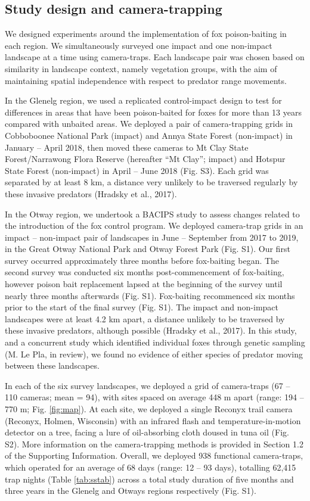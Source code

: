 \documentclass[]{elsarticle} %
\begin{document}
\hypertarget{study-design-and-camera-trapping}{%
\subsection{Study design and camera-trapping}\label{study-design-and-camera-trapping}}

We designed experiments around the implementation of fox poison-baiting in each region. We simultaneously surveyed one impact and one non-impact landscape at a time using camera-traps. Each landscape pair was chosen based on similarity in landscape context, namely vegetation groups, with the aim of maintaining spatial independence with respect to predator range movements.

In the Glenelg region, we used a replicated control-impact design to test for differences in areas that have been poison-baited for foxes for more than 13 years compared with unbaited areas. We deployed a pair of camera-trapping grids in Cobboboonee National Park (impact) and Annya State Forest (non-impact) in January -- April 2018, then moved these cameras to Mt Clay State Forest/Narrawong Flora Reserve (hereafter ``Mt Clay''; impact) and Hotspur State Forest (non-impact) in April -- June 2018 (Fig. S3). Each grid was separated by at least 8 km, a distance very unlikely to be traversed regularly by these invasive predators (Hradsky et al., 2017).

In the Otway region, we undertook a BACIPS study to assess changes related to the introduction of the fox control program. We deployed camera-trap grids in an impact -- non-impact pair of landscapes in June -- September from 2017 to 2019, in the Great Otway National Park and Otway Forest Park (Fig. S1). Our first survey occurred approximately three months before fox-baiting began. The second survey was conducted six months post-commencement of fox-baiting, however poison bait replacement lapsed at the beginning of the survey until nearly three months afterwards (Fig. S1). Fox-baiting recommenced six months prior to the start of the final survey (Fig. S1). The impact and non-impact landscapes were at least 4.2 km apart, a distance unlikely to be traversed by these invasive predators, although possible (Hradsky et al., 2017). In this study, and a concurrent study which identified individual foxes through genetic sampling (M. Le Pla, in review), we found no evidence of either species of predator moving between these landscapes.

In each of the six survey landscapes, we deployed a grid of camera-traps (67 -- 110 cameras; mean = 94), with sites spaced on average 448 m apart (range: 194 -- 770 m; Fig. \ref{fig:map}). At each site, we deployed a single Reconyx trail camera (Reconyx, Holmen, Wisconsin) with an infrared flash and temperature-in-motion detector on a tree, facing a lure of oil-absorbing cloth doused in tuna oil (Fig. S2). More information on the camera-trapping methods is provided in Section 1.2 of the Supporting Information. Overall, we deployed 938 functional camera-traps, which operated for an average of 68 days (range: 12 -- 93 days), totalling 62,415 trap nights (Table \ref{tab:sstab}) across a total study duration of five months and three years in the Glenelg and Otways regions respectively (Fig. S1).
\end{document}
